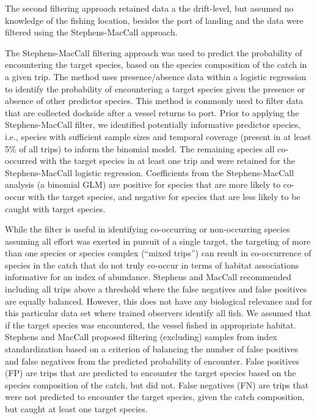 \documentclass[
  authoryear,
  preprint,
  3p]{elsarticle}
\begin{document}
The second filtering approach retained data a the drift-level, but
assumed no knowledge of the fishing location, besides the port of
landing and the data were filtered using the Stephens-MacCall approach.

The Stephens-MacCall \citeyearpar{Stephens:2004:MAS} filtering approach
was used to predict the probability of encountering the target species,
based on the species composition of the catch in a given trip. The
method uses presence/absence data within a logistic regression to
identify the probability of encountering a target species given the
presence or absence of other predictor species. This method is commonly
used to filter data that are collected dockside after a vessel returns
to port. Prior to applying the Stephens-MacCall filter, we identified
potentially informative predictor species, i.e., species with sufficient
sample sizes and temporal coverage (present in at least 5\% of all
trips) to inform the binomial model. The remaining species all
co-occurred with the target species in at least one trip and were
retained for the Stephens-MacCall logistic regression. Coefficients from
the Stephens-MacCall analysis (a binomial GLM) are positive for species
that are more likely to co-occur with the target species, and negative
for species that are less likely to be caught with target species.

While the filter is useful in identifying co-occurring or non-occurring
species assuming all effort was exerted in pursuit of a single target,
the targeting of more than one species or species complex (``mixed
trips'') can result in co-occurrence of species in the catch that do not
truly co-occur in terms of habitat associations informative for an index
of abundance. Stephens and MacCall \citeyearpar{Stephens:2004:MAS}
recommended including all trips above a threshold where the false
negatives and false positives are equally balanced. However, this does
not have any biological relevance and for this particular data set where
trained observers identify all fish. We assumed that if the target
species was encountered, the vessel fished in appropriate habitat.
Stephens and MacCall \citeyearpar{Stephens:2004:MAS} proposed filtering
(excluding) samples from index standardization based on a criterion of
balancing the number of false positives and false negatives from the
predicted probability of encounter. False positives (FP) are trips that
are predicted to encounter the target species based on the species
composition of the catch, but did not. False negatives (FN) are trips
that were not predicted to encounter the target species, given the catch
composition, but caught at least one target species.
\end{document}
